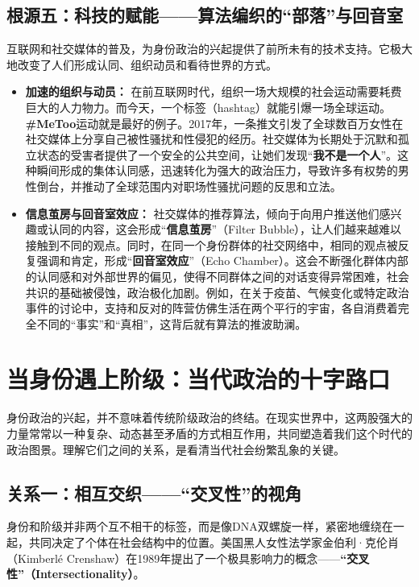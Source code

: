 \subsection{根源五：科技的赋能——算法编织的“部落”与回音室}

互联网和社交媒体的普及，为身份政治的兴起提供了前所未有的技术支持。它极大地改变了人们形成认同、组织动员和看待世界的方式。
\begin{itemize}
    \item \textbf{加速的组织与动员：} 在前互联网时代，组织一场大规模的社会运动需要耗费巨大的人力物力。而今天，一个标签（hashtag）就能引爆一场全球运动。\textbf{\#MeToo}运动就是最好的例子。2017年，一条推文引发了全球数百万女性在社交媒体上分享自己被性骚扰和性侵犯的经历。社交媒体为长期处于沉默和孤立状态的受害者提供了一个安全的公共空间，让她们发现“\textbf{我不是一个人}”。这种瞬间形成的集体认同感，迅速转化为强大的政治压力，导致许多有权势的男性倒台，并推动了全球范围内对职场性骚扰问题的反思和立法。

    \item \textbf{信息茧房与回音室效应：} 社交媒体的推荐算法，倾向于向用户推送他们感兴趣或认同的内容，这会形成“\textbf{信息茧房}”（Filter Bubble），让人们越来越难以接触到不同的观点。同时，在同一个身份群体的社交网络中，相同的观点被反复强调和肯定，形成“\textbf{回音室效应}”（Echo Chamber）。这会不断强化群体内部的认同感和对外部世界的偏见，使得不同群体之间的对话变得异常困难，社会共识的基础被侵蚀，政治极化加剧。例如，在关于疫苗、气候变化或特定政治事件的讨论中，支持和反对的阵营仿佛生活在两个平行的宇宙，各自消费着完全不同的“事实”和“真相”，这背后就有算法的推波助澜。
\end{itemize}

\section{ 当身份遇上阶级：当代政治的十字路口}

身份政治的兴起，并不意味着传统阶级政治的终结。在现实世界中，这两股强大的力量常常以一种复杂、动态甚至矛盾的方式相互作用，共同塑造着我们这个时代的政治图景。理解它们之间的关系，是看清当代社会纷繁乱象的关键。

\subsection{关系一：相互交织——“交叉性”的视角}

身份和阶级并非两个互不相干的标签，而是像DNA双螺旋一样，紧密地缠绕在一起，共同决定了个体在社会结构中的位置。美国黑人女性法学家金伯利·克伦肖（Kimberlé Crenshaw）在1989年提出了一个极具影响力的概念——\textbf{“交叉性”（Intersectionality）}。

